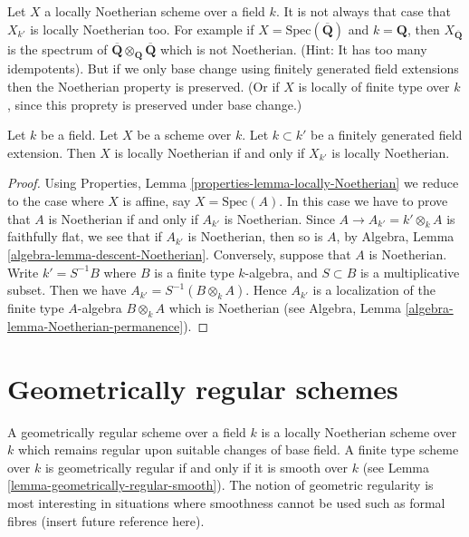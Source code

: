 \noindent
Let $X$ a locally Noetherian scheme over a field $k$.
It is not always that case that $X_{k'}$ is locally Noetherian too.
For example if $X = \text{Spec}(\overline{\mathbf{Q}})$ and
$k = \mathbf{Q}$, then $X_{\overline{\mathbf{Q}}}$ is the spectrum
of $\overline{\mathbf{Q}} \otimes_{\mathbf{Q}} \overline{\mathbf{Q}}$
which is not Noetherian. (Hint: It has too many idempotents).
But if we only base change using finitely generated field extensions
then the Noetherian property is preserved. (Or if $X$ is locally of finite
type over $k$, since this proprety is preserved under base change.)

\begin{lemma}
\label{lemma-locally-Noetherian-base-change}
Let $k$ be a field.
Let $X$ be a scheme over $k$.
Let $k \subset k'$ be a finitely generated field extension.
Then $X$ is locally Noetherian if and only if $X_{k'}$ is locally
Noetherian.
\end{lemma}

\begin{proof}
Using Properties, Lemma \ref{properties-lemma-locally-Noetherian}
we reduce to the case where $X$ is
affine, say $X = \text{Spec}(A)$. In this case we have to prove that
$A$ is Noetherian if and only if $A_{k'}$ is Noetherian.
Since $A \to A_{k'} = k' \otimes_k A$ is faithfully flat, we see
that if $A_{k'}$ is Noetherian, then so is $A$, by
Algebra, Lemma \ref{algebra-lemma-descent-Noetherian}.
Conversely, suppose that $A$ is Noetherian. Write $k' = S^{-1}B$
where $B$ is a finite type $k$-algebra, and $S \subset B$ is a
multiplicative subset. Then we have $A_{k'} = S^{-1}(B \otimes_k A)$.
Hence $A_{k'}$ is a localization of the finite type $A$-algebra
$B \otimes_k A$ which is Noetherian (see
Algebra, Lemma \ref{algebra-lemma-Noetherian-permanence}).
\end{proof}







\section{Geometrically regular schemes}
\label{section-geometrically-regular}

\noindent
A geometrically regular scheme over a field $k$ is a locally Noetherian
scheme over $k$ which remains regular upon suitable changes of base field.
A finite type scheme over $k$ is geometrically regular if and only
if it is smooth over $k$ (see Lemma \ref{lemma-geometrically-regular-smooth}).
The notion of geometric regularity is most interesting in situations
where smoothness cannot be used such as formal fibres (insert future
reference here).

